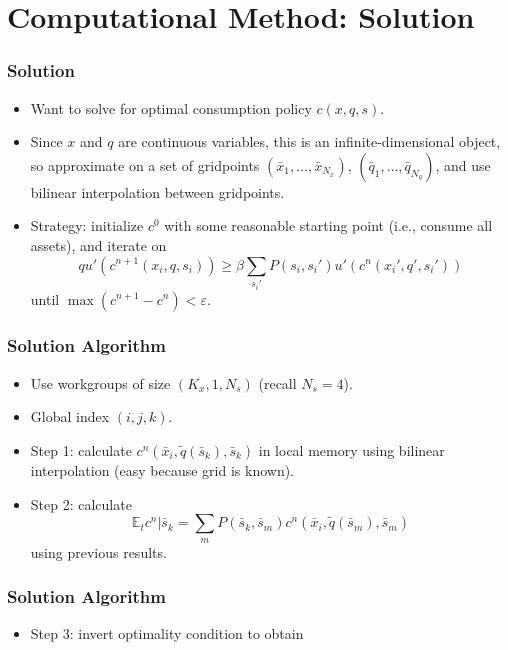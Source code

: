 \documentclass[handout]{beamer}
\newcommand{\E}{\mathbb{E}}
\newcommand{\eps}{\varepsilon}
\theoremstyle{definition}
\begin{document}
\section{Computational Method: Solution}

\begin{frame}
  \frametitle{Solution}
  \begin{itemize}[<+->]
  \item Want to solve for optimal consumption policy $c(x, q, s)$.
  \item Since $x$ and $q$ are continuous variables, this is an infinite-dimensional object, so approximate on a set of gridpoints $(\bar{x}_1, \ldots, \bar{x}_{N_x})$, $(\bar{q}_1, \ldots, \bar{q}_{N_q})$, and use bilinear interpolation between gridpoints.
  \item Strategy: initialize $c^0$ with some reasonable starting point (i.e., consume all assets), and iterate on
    \[ q u'(c^{n+1}(x_i, q, s_i)) \ge \beta \sum_{s_i'} P(s_i, s_i') u'(c^n(x_i', q', s_i')) \]
    until $\max(c^{n+1} - c^n) < \eps$.
  \end{itemize}
\end{frame}


\begin{frame}
  \frametitle{Solution Algorithm}
  \begin{itemize}[<+->]
  \item Use workgroups of size $(K_x, 1, N_s)$ (recall $N_s = 4$).
  \item Global index $(i, j, k)$.
  \item Step 1: calculate $c^n(\bar{x}_i, \tilde{q}(\bar{s}_k), \bar{s}_k)$ in local memory using bilinear interpolation (easy because grid is known).
  \item Step 2: calculate
    \[ \E_t c^n | \bar{s}_k = \sum_m P(\bar{s}_k, \bar{s}_m) c^n(\bar{x}_i, \tilde{q}(\bar{s}_m), \bar{s}_m) \]
    using previous results.
  \end{itemize}
\end{frame}

\begin{frame}
  \frametitle{Solution Algorithm}
  \begin{itemize}[<+->]
  \item Step 3: invert optimality condition to obtain 
  \end{itemize}
\end{frame}
\end{document}
